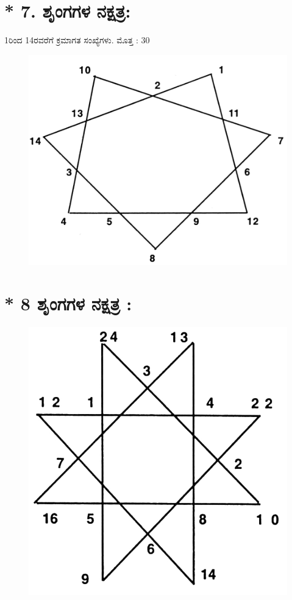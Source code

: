 \newpage

\section*{* 7. ಶೃಂಗಗಳ ನಕ್ಷತ್ರ:} 

1ರಿಂದ 14ರವರೆಗೆ ಕ್ರಮಾಗತ ಸಂಖ್ಯೆಗಳು. ಮೊತ್ತ : 30
\begin{figure}[H]
\includegraphics[scale=0.85]{src/figures/chap8/fig8.5.jpg}
\end{figure}

\section*{* 8 ಶೃಂಗಗಳ ನಕ್ಷತ್ರ :}

\begin{figure}[H]
\includegraphics[scale=0.9]{src/figures/chap8/fig8.6.jpg}
\end{figure}

